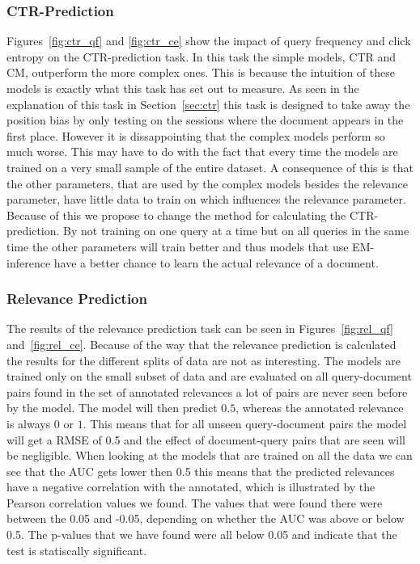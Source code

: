 \subsubsection{CTR-Prediction}
Figures~\ref{fig:ctr_qf} and \ref{fig:ctr_ce} show the impact of query frequency and click entropy on the CTR-prediction task. In this task the simple models, CTR and CM, outperform the more complex ones. This is because the intuition of these models is exactly what this task has set out to measure. As seen in the explanation of this task in Section~\ref{sec:ctr} this task is designed to take away the position bias by only testing on the sessions where the document appears in the first place. However it is dissappointing that the complex models perform so much worse. This may have to do with the fact that every time the models are trained on a very small sample of the entire dataset. A consequence of this is that the other parameters, that are used by the complex models besides the relevance parameter, have little data to train on which influences the relevance parameter. Because of this we propose to change the method for calculating the CTR-prediction. By not training on one query at a time but on all queries in the same time the other parameters will train better and thus models that use EM-inference have a better chance to learn the actual relevance of a document.

\subsubsection{Relevance Prediction}
The results of the relevance prediction task can be seen in Figures~\ref{fig:rel_qf} and~\ref{fig:rel_ce}. Because of the way that the relevance prediction is calculated the results for the different splits of data are not as interesting. The models are trained only on the small subset of data and are evaluated on all query-document pairs found in the set of annotated relevances a lot of pairs are never seen before by the model. The model will then predict $0.5$, whereas the annotated relevance is always $0$ or $1$. This means that for all unseen query-document pairs the model will get a RMSE of 0.5 and the effect of document-query pairs that are seen will be negligible. When looking at the models that are trained on all the data we can see that the AUC gets lower then 0.5 this means that the predicted relevances have a negative correlation with the annotated, which is illustrated by the Pearson correlation values we found. The values that were found there were between the 0.05 and -0.05, depending on whether the AUC was above or below 0.5. The p-values that we have found were all below 0.05 and indicate that the test is statiscally significant.

